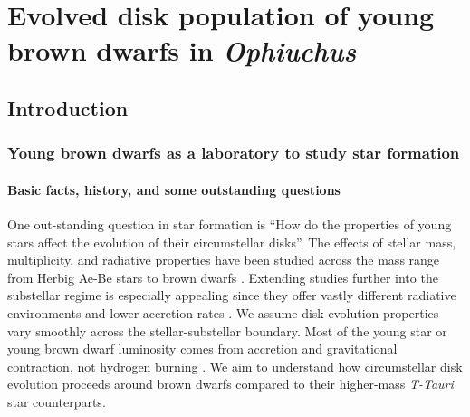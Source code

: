 \chapter{Evolved disk population of young brown dwarfs in \emph{Ophiuchus}}

\section{Introduction}

\subsection{Young brown dwarfs as a laboratory to study star formation}

\subsubsection{Basic facts, history, and some outstanding questions}
One out-standing question in star formation is ``How do the properties of young stars affect the evolution of their circumstellar disks''.  The effects of stellar mass, multiplicity, and radiative properties have been studied across the mass range from Herbig Ae-Be stars to brown dwarfs \citep{2011ARA&A..49...67W}.  Extending studies further into the substellar regime is especially appealing since they offer vastly different radiative environments and lower accretion rates \citep{2003ApJ...592..266M,2009ApJ...696.1589H}.  We assume disk evolution properties vary smoothly across the stellar-substellar boundary.  Most of the young star or young brown dwarf luminosity comes from accretion and gravitational contraction, not hydrogen burning \citep{2003A&A...402..701B}.  We aim to understand how circumstellar disk evolution proceeds around brown dwarfs compared to their higher-mass \emph{T-Tauri} star counterparts.



